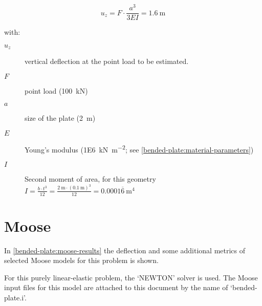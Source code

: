 \begin{equation}
    \label{bended-plate:analytical-solution}
    u_z = F \cdot \frac{a ^ 3}{3EI} = \qty{1.6}{\metre}
\end{equation}

\begin{samepage}
    with:
    \begin{description}
        \item[$u_{z}$] vertical deflection at the point load to be estimated.
        \item[$F$] point load (\qty{100}{\kilo\newton})
        \item[$a$] size of the plate (\qty{2}{\metre})
        \item[$E$] Young's modulus (\qty[per-mode = symbol]{1E6}{\kilo\newton\per\square\metre}; see \autoref{bended-plate:material-parameters})
        \item[$I$] Second moment of area, for this geometry $I = \frac{b \cdot t^3}{12} = \frac{\qty{2}{\metre} \cdot (\qty{0.1}{\metre})^3}{12} = 0.0001\overline{6} \qty{}{\metre}^4 $
    \end{description}
\end{samepage}

\section{Moose}
\label{bended-plate:sec:moose}

In \autoref{bended-plate:moose-results} the deflection and some additional
metrics of selected Moose models for this problem is shown.

For this purely linear-elastic problem, the ‘NEWTON’ solver is used. The Moose
input files for this model are attached to this document by the name of
‘bended-plate.i’.


